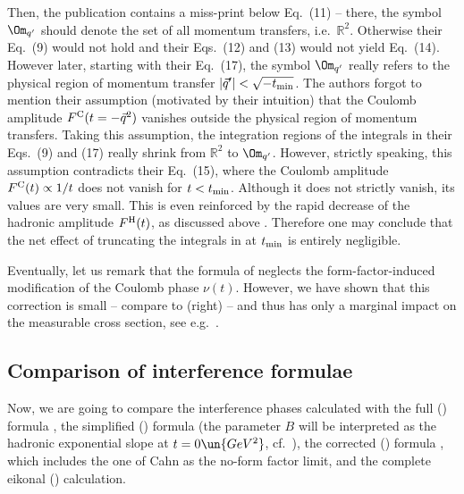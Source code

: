 Then, the publication  contains a miss-print below Eq.~(11) -- there, the symbol $\Om_{q'}$ should denote the set of all momentum transfers, i.e.~$\mathbb{R}^2$. Otherwise their Eq.~(9) would not hold and their Eqs.~(12) and (13) would not yield Eq.~(14). However later, starting with their Eq.~(17), the symbol $\Om_{q'}$ really refers to the physical region of momentum transfer $|\vec q'| < \sqrt{-t_{\rm min}}$. The authors forgot to mention their assumption (motivated by their intuition) that the Coulomb amplitude $F^{\rm C}(t = -\vec q^2)$ vanishes outside the physical region of momentum transfers. Taking this assumption, the integration regions of the integrals in their Eqs.~(9) and (17) really shrink from $\mathbb R^2$ to $\Om_{q'}$. However, strictly speaking, this assumption contradicts their Eq.~(15), where the Coulomb amplitude $F^{\rm C}(t) \propto 1/t$ does not vanish for $t < t_{\rm min}$. Although it does not strictly vanish, its values are very small. This is even reinforced by the rapid decrease of the hadronic amplitude $F^{\rm H}(t)$, as discussed above . Therefore one may conclude that the net effect of truncating the integrals in  at $t_{\rm min}$ is entirely negligible.

Eventually, let us remark that the formula of \KaL{} neglects the form-factor-induced modification of the Coulomb phase $\nu(t)$. However, we have shown that this correction is small -- compare  to  (right) -- and thus has only a marginal impact on the measurable cross section, see e.g.~.


\subsection[int cmp]{Comparison of interference formulae}

Now, we are going to compare the interference phases calculated with
{
\> the full \WY{} () formula ,
\> the simplified \WY{} () formula  (the parameter $B$ will be interpreted as the hadronic exponential slope at $t=0\un{GeV^2}$, cf.~),
\> the corrected \KL{} () formula , which includes the one of Cahn as the no-form factor limit, and
\> the complete eikonal () calculation.
}

